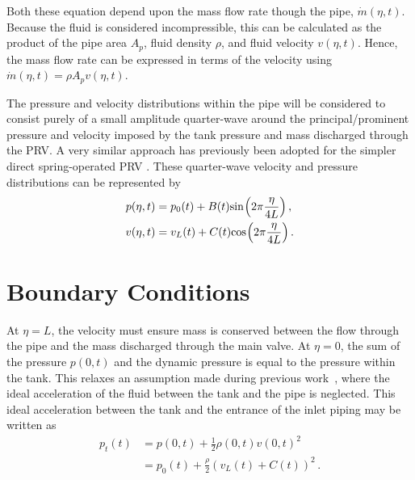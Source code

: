 Both these equation depend upon the mass flow rate though the pipe, $\dot{m}(\eta,t)$. Because the fluid is considered incompressible, this can be calculated as the product of the pipe area $A_p$, fluid density $\rho$, and fluid velocity $v(\eta,t)$. Hence, the mass flow rate can be expressed in terms of the velocity using $\dot{m}(\eta,t) = \rho A_p v(\eta,t)$.

The pressure and velocity distributions within the pipe will be considered to consist purely of a small amplitude quarter-wave around the principal/prominent pressure and velocity imposed by the tank pressure and mass discharged through the PRV. A very similar approach has previously been adopted for the simpler direct spring-operated PRV \cite{Hos2016DynamicService,Hos2015ModelPipe}. These quarter-wave velocity and pressure distributions can be represented by
~
\begin{equation} \label{eq: PressVelDist}
\begin{split}
    p(\eta,t) &= p_0(t) + B(t) \fun{sin}{2\pi \frac{\eta}{4L}} \, ,\\
    v(\eta,t) &= v_L(t) + C(t) \fun{cos}{2\pi \frac{\eta}{4L}} \, .
\end{split}
\end{equation}

\newpage
\section{Boundary Conditions}

At $\eta = L$, the velocity must ensure mass is conserved between the flow through the pipe and the mass discharged through the main valve. At $\eta = 0$, the sum of the pressure $p(0,t)$ and the dynamic pressure is equal to the pressure within the tank. This relaxes an assumption made during previous work~\cite{Hos2015ModelPipe}, where the ideal acceleration of the fluid between the tank and the pipe is neglected. This ideal acceleration between the tank and the entrance of the inlet piping may be written as
~
\begin{equation} \label{eq: QWMBoundary1}
\begin{split}
    p_t(t) &= p(0,t) + \frac{1}{2} \rho(0,t) v(0,t)^2 \\
           &= p_0(t) + \frac{\rho}{2} \left( v_L(t) + C(t) \right)^2 \, .
\end{split}
\end{equation}

